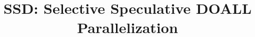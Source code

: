 \documentclass[pageno]{jpaper}
\begin{document}
 \title{
 SSD: Selective Speculative DOALL Parallelization}

 \date{}
 \maketitle

 \thispagestyle{empty}

 
 
 
 


 
 


 
\end{document}
